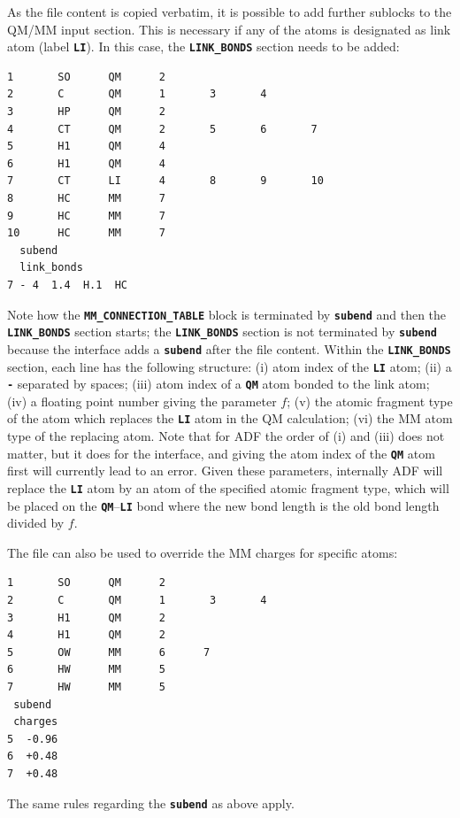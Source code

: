 \documentclass[a4paper,10pt,DIV=15,openany]{scrbook}
\newcommand{\ttt}[1]{\textbf{\texttt{#1}}}
\newenvironment{example}{
  \setlength{\OuterFrameSep}{3pt}
  \vspace{0mm}
  \definecolor{shadecolor}{HTML}{E4F4FF}
  \begin{shaded}
}{
  \end{shaded}
}
\begin{document}
As the file content is copied verbatim, it is possible to add further sublocks to the QM/MM input section.
This is necessary if any of the atoms is designated as link atom (label \ttt{LI}).
In this case, the \ttt{LINK\_BONDS} section needs to be added:
\begin{example}
  \begin{verbatim}
1       SO      QM      2
2       C       QM      1       3       4
3       HP      QM      2
4       CT      QM      2       5       6       7
5       H1      QM      4
6       H1      QM      4
7       CT      LI      4       8       9       10
8       HC      MM      7
9       HC      MM      7
10      HC      MM      7
  subend
  link_bonds
7 - 4  1.4  H.1  HC
\end{verbatim}
\end{example}
Note how the \ttt{MM\_CONNECTION\_TABLE} block is terminated by \ttt{subend} and then the \ttt{LINK\_BONDS} section starts; the \ttt{LINK\_BONDS} section is not terminated by \ttt{subend} because the interface adds a \ttt{subend} after the file content.
Within the \ttt{LINK\_BONDS} section, each line has the following structure: (i) atom index of the \ttt{LI} atom; (ii) a \ttt{-} separated by spaces; (iii) atom index of a \ttt{QM} atom bonded to the link atom; (iv) a floating point number giving the parameter $f$; (v) the atomic fragment type of the atom which replaces the \ttt{LI} atom in the QM calculation; (vi) the MM atom type of the replacing atom.
Note that for ADF the order of (i) and (iii) does not matter, but it does for the interface, and giving the atom index of the \ttt{QM} atom first will currently lead to an error.
Given these parameters, internally ADF will replace the \ttt{LI} atom by an atom of the specified atomic fragment type, which will be placed on the \ttt{QM}--\ttt{LI} bond where the new bond length is the old bond length divided by $f$.

The file can also be used to override the MM charges for specific atoms:
\begin{example}
  \begin{verbatim}
1       SO      QM      2
2       C       QM      1       3       4
3       H1      QM      2
4       H1      QM      2
5       OW      MM      6      7
6       HW      MM      5
7       HW      MM      5
 subend
 charges
5  -0.96
6  +0.48
7  +0.48
\end{verbatim}
\end{example}
The same rules regarding the \ttt{subend} as above apply.
\end{document}
